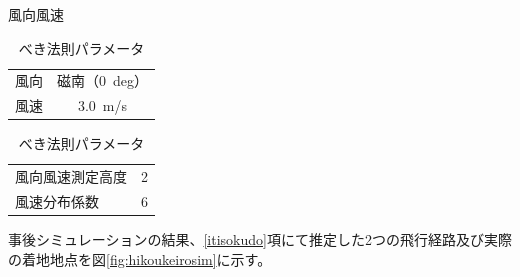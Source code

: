 \documentclass[a4paper,11pt,titlepage,uplatex]{jsarticle}
\begin{document}
\begin{table}[H]
    \begin{minipage}[t]{0.55\hsize}
        \centering
        \caption{風向風速}
        \begin{tabular}[t]{lc} \hline
            風向 & 磁南（\SI{0}{deg}） \\
            風速 & \SI{3.0}{m/s}   \\\hline
        \end{tabular}
        \label{tab:huukouhuusoku}
    \end{minipage}
    \begin{minipage}[t]{0.55\hsize}
        \centering
        \caption{べき法則パラメータ}
        \begin{tabular}[t]{lr} \hline
            風向風速測定高度 & 2 \\
            風速分布係数   & 6 \\ \hline
        \end{tabular}
        \label{tab:bekihousoku}
    \end{minipage}
\end{table}

事後シミュレーションの結果、\ref{itisokudo}項にて推定した2つの飛行経路及び実際の着地地点を図\ref{fig:hikoukeirosim}に示す。
\end{document}
